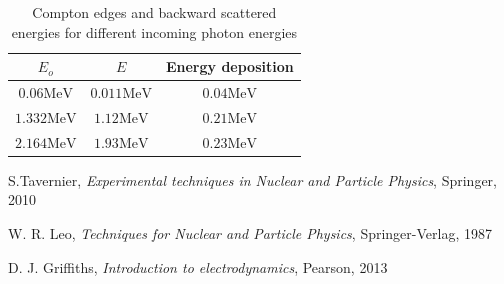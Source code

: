 \documentclass[10pt,a4paper]{article}
\newcommand{\mev}{\si{\mega\electronvolt}}
\begin{document}
\begin{enumerate}
\begin{table}[!ht]
\centering
\begin{tabular}{ccc}
\toprule
  $E_o$ & $E$ & Energy deposition \\
  \midrule
  $0.06\mev$ & $0.011\mev$ & $0.04\mev$ \\
  $1.332\mev$ & $1.12\mev$ & $0.21\mev$ \\
  $2.164\mev$ & $1.93\mev$ & $0.23\mev$ \\
  \bottomrule
\end{tabular}
\caption{Compton edges and backward scattered energies for different incoming photon energies}
\label{tab:edges}
\end{table}
\end{enumerate}

\pagebreak


\begin{thebibliography}{5}
S.Tavernier, \textit{Experimental techniques in Nuclear and Particle Physics}, Springer, 2010

 W. R. Leo, \textit{Techniques for Nuclear and Particle Physics}, Springer-Verlag, 1987

 D. J. Griffiths, \textit{Introduction to electrodynamics}, Pearson, 2013

\end{thebibliography}
\end{document}

